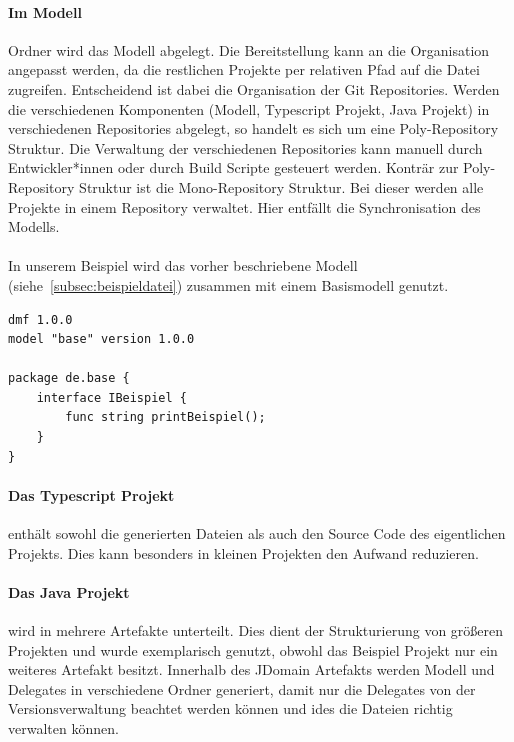 \documentclass[./einleitung.tex]{subfiles}
\begin{document}
    \paragraph{Im Modell} Ordner wird das Modell abgelegt.
    Die Bereitstellung kann an die Organisation angepasst werden, da die restlichen Projekte per relativen Pfad auf die Datei zugreifen.
    Entscheidend ist dabei die Organisation der Git Repositories.
    Werden die verschiedenen Komponenten (Modell, Typescript Projekt, Java Projekt) in verschiedenen Repositories abgelegt, so handelt es sich um eine Poly-Repository Struktur. \cite{monorepo}
    Die Verwaltung der verschiedenen Repositories kann manuell durch Entwickler*innen oder durch Build Scripte gesteuert werden.
    Konträr zur Poly-Repository Struktur ist die Mono-Repository Struktur.
    Bei dieser werden alle Projekte in einem Repository verwaltet. \cite{monorepo}
    Hier entfällt die Synchronisation des Modells.
    \\\\
    In unserem Beispiel wird das vorher beschriebene Modell (siehe~\ref{subsec:beispieldatei}) zusammen mit einem Basismodell genutzt.
    \begin{lstlisting}[language=dmf, caption=Das Basismodell, label=lst:basismodell]
dmf 1.0.0
model "base" version 1.0.0

package de.base {
    interface IBeispiel {
        func string printBeispiel();
    }
}
    \end{lstlisting}

    \paragraph{Das Typescript Projekt} enthält sowohl die generierten Dateien als auch den Source Code des eigentlichen Projekts.
    Dies kann besonders in kleinen Projekten den Aufwand reduzieren.

    \paragraph{Das Java Projekt} wird in mehrere Artefakte unterteilt.
    Dies dient der Strukturierung von größeren Projekten und wurde exemplarisch genutzt, obwohl das Beispiel Projekt nur ein weiteres Artefakt besitzt.
    Innerhalb des JDomain Artefakts werden Modell und Delegates in verschiedene Ordner generiert, damit nur die Delegates von der Versionsverwaltung beachtet werden können und \acrshort{ide}s die Dateien richtig verwalten können.
\end{document}
